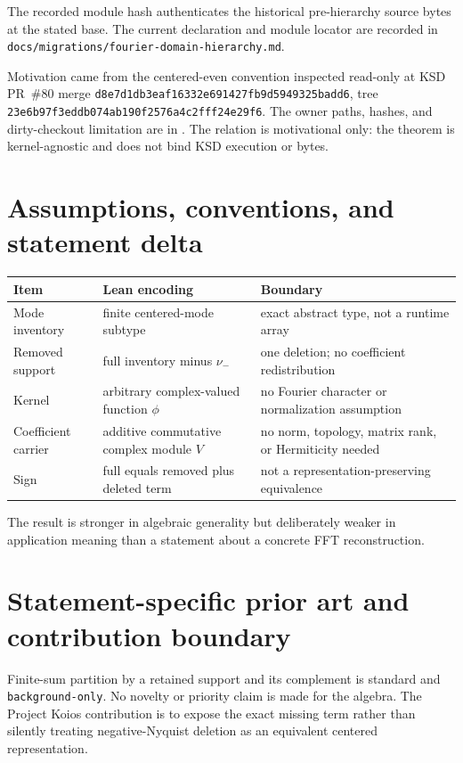\documentclass[11pt]{article}
\begin{document}
The recorded module hash authenticates the historical pre-hierarchy source bytes at the stated base. The current declaration and module locator are recorded in \texttt{docs/migrations/fourier-domain-hierarchy.md}.

Motivation came from the centered-even convention inspected read-only at KSD PR~\#80 merge
\texttt{d8e7d1db3eaf16332e691427fb9d5949325badd6}, tree
\texttt{23e6b97f3eddb074ab190f2576a4c2fff24e29f6}.  The owner paths, hashes, and dirty-checkout
limitation are in .  The relation is motivational only: the theorem is
kernel-agnostic and does not bind KSD execution or bytes.

\section{Assumptions, conventions, and statement delta}
\begin{tabularx}{\textwidth}{@{}lXX@{}}
\toprule
Item & Lean encoding & Boundary \\
\midrule
Mode inventory & finite centered-mode subtype & exact abstract type, not a runtime array \\
Removed support & full inventory minus $\nu_-$ & one deletion; no coefficient redistribution \\
Kernel & arbitrary complex-valued function $\phi$ & no Fourier character or normalization assumption \\
Coefficient carrier & additive commutative complex module $V$ & no norm, topology, matrix rank, or Hermiticity needed \\
Sign & full equals removed plus deleted term & not a representation-preserving equivalence \\
\bottomrule
\end{tabularx}
The result is stronger in algebraic generality but deliberately weaker in application meaning than
a statement about a concrete FFT reconstruction.

\section{Statement-specific prior art and contribution boundary}
Finite-sum partition by a retained support and its complement is standard and
\texttt{background-only}.  No novelty or priority claim is made for the algebra.  The Project Koios
contribution is to expose the exact missing term rather than silently treating negative-Nyquist
deletion as an equivalent centered representation.
\end{document}

